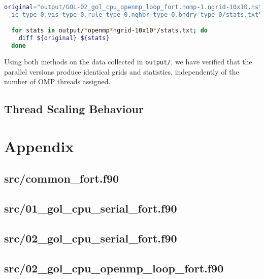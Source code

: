 \documentclass[]{article}
\begin{document}
\begin{lstlisting}[language=Bash]
  original="output/GOL-02_gol_cpu_openmp_loop_fort.nomp-1.ngrid-10x10.nsteps-10.\
  ic_type-0.vis_type-0.rule_type-0.nghbr_type-0.bndry_type-0/stats.txt"

  for stats in output/*openmp*ngrid-10x10*/stats.txt; do
    diff ${original} ${stats}
  done
\end{lstlisting}

Using both methods on the data collected in \lstinline[style=ff]{output/}, we
have verified that the parallel versions produce identical grids and statistics,
independently of the number of OMP threads assigned.


\subsection{Thread Scaling Behaviour}
\label{sec:thread-scaling-behaviour}

\newpage
\appendix
\section{Appendix}
\label{sec:appendix}

\subsection{src/common\_fort.f90}
\label{sec:common_fort}



\newpage
\subsection{src/01\_gol\_cpu\_serial\_fort.f90}
\label{sec:01_gol_cpu_serial_fort}



\newpage
\subsection{src/02\_gol\_cpu\_serial\_fort.f90}
\label{sec:02_gol_cpu_serial_fort}



\newpage
\subsection{src/02\_gol\_cpu\_openmp\_loop\_fort.f90}
\label{sec:02_gol_cpu_openmp_loop_fort}
\end{document}
